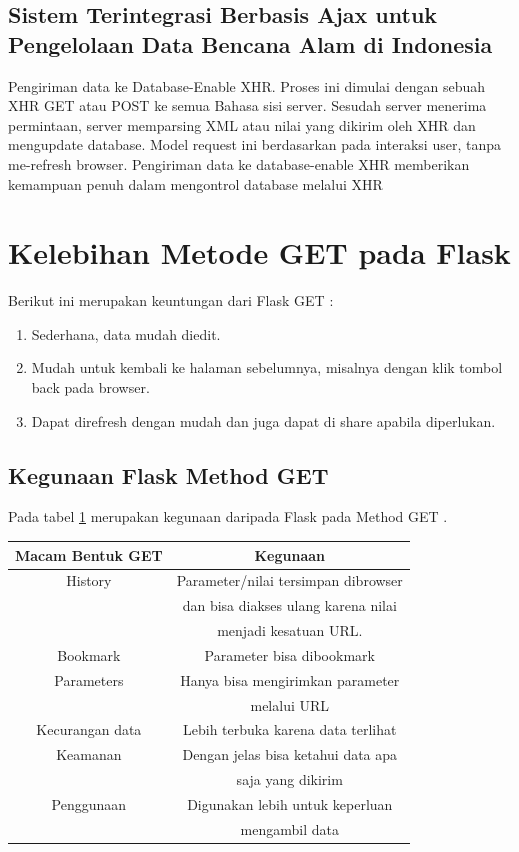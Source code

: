 \subsection{Sistem Terintegrasi Berbasis Ajax untuk Pengelolaan Data Bencana Alam di Indonesia}
Pengiriman data ke Database-Enable XHR. Proses ini dimulai dengan sebuah XHR GET atau POST ke semua Bahasa sisi server. Sesudah server menerima permintaan, server memparsing XML atau nilai yang dikirim oleh XHR dan mengupdate database. Model request ini berdasarkan pada interaksi user, tanpa me-refresh browser. Pengiriman data ke database-enable XHR memberikan kemampuan penuh dalam mengontrol database melalui XHR \cite{prasetyo2007sistem}

\section{Kelebihan Metode GET pada Flask}
Berikut ini merupakan keuntungan dari Flask GET \cite{lokhande2015efficient}:
\begin{enumerate}
\item Sederhana, data mudah diedit.
\item Mudah untuk kembali ke halaman sebelumnya, misalnya dengan klik tombol back pada browser.
\item Dapat direfresh dengan mudah dan juga dapat di share apabila diperlukan.
\end{enumerate}
\subsection{Kegunaan Flask Method GET}
Pada tabel \ref{table:contoh} merupakan kegunaan daripada Flask pada Method GET \cite{grinberg2018flask}.
\begin{table}[h]
\begin{tabular}{|c|c|}
\hline
Macam Bentuk GET&Kegunaan\\
\hline
History&Parameter/nilai tersimpan dibrowser\\
&dan bisa diakses ulang karena nilai\\
&menjadi kesatuan URL.\\
Bookmark&Parameter bisa dibookmark\\
Parameters&Hanya bisa mengirimkan parameter\\
&melalui URL\\
Kecurangan data&Lebih terbuka karena data terlihat\\
Keamanan&Dengan jelas bisa ketahui data apa \\
&saja yang dikirim\\
Penggunaan&Digunakan lebih untuk keperluan \\
&mengambil data\\
\hline
\end{tabular}
\label{table:contoh}
\end{table}




